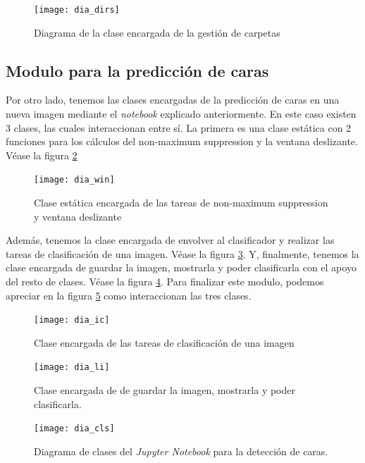 \begin{figure}
\centering
\texttt{[image: dia\_dirs]}
\caption{Diagrama de la clase encargada de la gestión de carpetas}
\label{fig:C.4.2}
\end{figure}

\subsection{Modulo para la predicción de caras}

Por otro lado, tenemos las clases encargadas de la predicción de caras en una nueva imagen mediante el \textit{notebook} explicado anteriormente. En este caso existen 3 clases, las cuales interaccionan entre sí. La primera es una clase estática con 2 funciones para los cálculos del non-maximum suppression y la ventana deslizante. Véase la figura \ref{fig:C.4.3} 


\begin{figure}
\centering
\texttt{[image: dia\_win]}
\caption[Clase estática encargada de varias tareas]{Clase estática encargada de las tareas de non-maximum suppression y ventana deslizante}
\label{fig:C.4.3}
\end{figure}

Además, tenemos la clase encargada de envolver al clasificador y realizar las tareas de clasificación de una imagen. Véase la figura \ref{fig:C.4.4}. Y, finalmente, tenemos la clase encargada de guardar la imagen, mostrarla y poder clasificarla con el apoyo del resto de clases. Véase la figura \ref{fig:C.4.5}. Para finalizar este modulo, podemos apreciar en la figura \ref{fig:C.4.6} como interaccionan las tres clases.

\begin{figure}
\centering
\texttt{[image: dia\_ic]}
\caption{Clase encargada de las tareas de clasificación de una imagen}
\label{fig:C.4.4}
\end{figure}

\begin{figure}
\centering
\texttt{[image: dia\_li]}
\caption[Clases encargadas de la clasificación]{Clase encargada de de guardar la imagen, mostrarla y poder clasificarla.}
\label{fig:C.4.5}
\end{figure}

\begin{figure}
\centering
\texttt{[image: dia\_cls]}
\caption{Diagrama de clases del \textit{Jupyter Notebook} para la detección de caras.}
\label{fig:C.4.6}
\end{figure}

